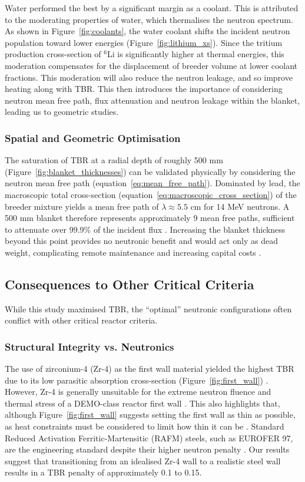 \documentclass[12pt]{article}
\begin{document}
Water performed the best by a significant margin as a coolant. This is attributed to the moderating
properties of water, which thermalises the neutron spectrum. As shown in Figure~\ref{fig:coolants},
the water coolant shifts the incident neutron population toward lower energies
(Figure~\ref{fig:lithium_xs}). Since the tritium production cross-section of $^6$Li is significantly
higher at thermal energies, this moderation compensates for the displacement of breeder volume at
lower coolant fractions. This moderation will also reduce the neutron leakage, and so improve
heating along with TBR. This then introduces the importance of considering neutron mean free path,
flux attenuation and neutron leakage within the blanket, leading us to geometric studies.

\subsubsection{Spatial and Geometric Optimisation}
The saturation of TBR at a radial depth of roughly 500 mm (Figure~\ref{fig:blanket_thicknesses}) can
be validated physically by considering the neutron mean free path
(equation~\ref{eq:mean_free_path}). Dominated by lead, the macroscopic total cross-section
(equation~\ref{eq:macroscopic_cross_section}) of the breeder mixture yields a mean free path of
$\lambda \approx 5.5$ cm for 14 MeV neutrons. A 500 mm blanket therefore represents approximately 9
mean free paths, sufficient to attenuate over 99.9\% of the incident flux
\cite{kuridan_neutron_2023}. Increasing the blanket thickness beyond this point provides no
neutronic benefit and would act only as dead weight, complicating remote maintenance and increasing
capital costs \cite{federici_overview_2019}.

\subsection{Consequences to Other Critical Criteria}

While this study maximised TBR, the ``optimal'' neutronic configurations often conflict with other
critical reactor criteria.

\subsubsection{Structural Integrity vs. Neutronics}
The use of zirconium-4 (Zr-4) as the first wall material yielded the highest TBR due to its low
parasitic absorption cross-section (Figure~\ref{fig:first_wall}) \cite{king_high_2022}. However,
Zr-4 is generally unsuitable for the extreme neutron fluence and thermal stress of a DEMO-class
reactor first wall \cite{king_high_2022}. This also highlights that, although Figure~\ref{fig:first_wall}
suggests setting the first wall as thin as possible, as heat constraints must be considered to limit
how thin it can be \cite{stornelli_ultra-fine_2024}. Standard Reduced Activation
Ferritic-Martensitic (RAFM) steels, such as EUROFER 97, are the engineering standard despite their
higher neutron penalty \cite{stornelli_ultra-fine_2024}. Our results suggest that transitioning from
an idealised Zr-4 wall to a realistic steel wall results in a TBR penalty of approximately 0.1 to
0.15.
\end{document}
